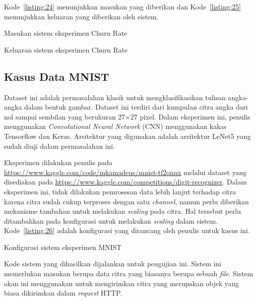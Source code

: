 Kode~\ref{listing:24} menunjukkan masukan yang diberikan dan Kode~\ref{listing:25} menunjukkan keluaran yang diberikan oleh sistem.

\begin{code}
	\caption{Masukan sistem eksperimen Churn Rate}\label{listing:24}
\end{code}

\begin{code}
	\caption{Keluaran sistem eksperimen Churn Rate}\label{listing:25}
\end{code}

\subsection{Kasus Data MNIST}

Dataset ini adalah permasalahan klasik untuk mengklasifikasikan tulisan angka-angka dalam bentuk gambar.
Dataset ini terdiri dari kumpulan citra angka dari nol sampai sembilan yang berukuran 27\(\times\)27 pixel.
Dalam eksperimen ini, penulis menggunakan \textit{Convolutional Neural Network} (CNN) menggunakan kakas Tensorflow dan Keras.
Arsitektur yang digunakan adalah arsitektur LeNet5 yang sudah diuji dalam permasalahan ini.

Eksperimen dilakukan penulis pada \url{https://www.kaggle.com/code/mkamadeus/mnist-tf2onnx} melalui dataset yang disediakan pada \url{https://www.kaggle.com/competitions/digit-recognizer}.
Dalam eksperimen ini, tidak dilakukan pemrosesan data lebih lanjut terhadap citra karena citra sudah cukup terproses dengan satu \textit{channel}, namun perlu diberikan mekanisme tambahan untuk melakukan \textit{scaling} pada citra.
Hal tersebut perlu ditambahkan pada konfigurasi untuk melakukan \textit{scaling} dalam sistem.
Kode~\ref{listing:26} adalah konfigurasi yang dirancang oleh penulis untuk kasus ini.


\begin{code}
	\caption{Konfigurasi sistem eksperimen MNIST}\label{listing:26}
\end{code}

Kode sistem yang dihasilkan dijalankan untuk pengujian ini.
Sistem ini memerlukan masukan berupa data citra yang biasanya berupa sebuah \textit{file}.
Sistem akan ini menggunakan  untuk mengirimkan citra yang merupakan objek yang biasa dikirimkan dalam \textit{request} HTTP.\@

